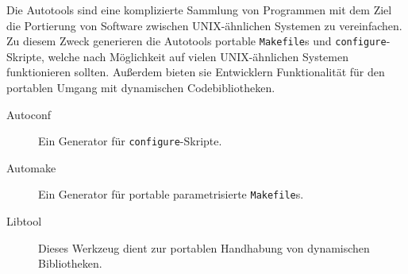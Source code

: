 Die Autotools  sind eine komplizierte
Sammlung von Programmen mit dem Ziel die Portierung von Software zwischen
UNIX-ähnlichen Systemen zu vereinfachen.
%
Zu diesem Zweck generieren die Autotools portable \texttt{Makefile}s und
\texttt{configure}-Skripte, welche nach Möglichkeit auf vielen UNIX-ähnlichen
Systemen funktionieren sollten. Außerdem bieten sie Entwicklern Funktionalität
für den portablen Umgang mit dynamischen Codebibliotheken.

\begin{description}
	\item[Autoconf] Ein Generator für \texttt{configure}-Skripte.
	\item[Automake] Ein Generator für portable parametrisierte
	\texttt{Makefile}s.
	\item[Libtool] Dieses Werkzeug dient zur portablen Handhabung von
	dynamischen Bibliotheken.
\end{description}
